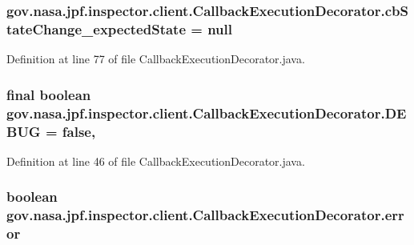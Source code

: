\subsubsection[{\texorpdfstring{cb\+State\+Change\+\_\+expected\+State}{cbStateChange_expectedState}}]{ gov.\+nasa.\+jpf.\+inspector.\+client.\+Callback\+Execution\+Decorator.\+cb\+State\+Change\+\_\+expected\+State = null\hspace{0.3cm}{\ttfamily [protected]}}\hypertarget{classgov_1_1nasa_1_1jpf_1_1inspector_1_1client_1_1_callback_execution_decorator_a300944aa979608f761bf4061da40f587}{}\label{classgov_1_1nasa_1_1jpf_1_1inspector_1_1client_1_1_callback_execution_decorator_a300944aa979608f761bf4061da40f587}


Definition at line 77 of file Callback\+Execution\+Decorator.\+java.

\subsubsection[{\texorpdfstring{D\+E\+B\+UG}{DEBUG}}]{\setlength{\rightskip}{0pt plus 5cm}final boolean gov.\+nasa.\+jpf.\+inspector.\+client.\+Callback\+Execution\+Decorator.\+D\+E\+B\+UG = false\hspace{0.3cm}{\ttfamily [static]}, {\ttfamily [protected]}}\hypertarget{classgov_1_1nasa_1_1jpf_1_1inspector_1_1client_1_1_callback_execution_decorator_a28cdde5503944b9bff2957ae0dc55d16}{}\label{classgov_1_1nasa_1_1jpf_1_1inspector_1_1client_1_1_callback_execution_decorator_a28cdde5503944b9bff2957ae0dc55d16}


Definition at line 46 of file Callback\+Execution\+Decorator.\+java.

\subsubsection[{\texorpdfstring{error}{error}}]{\setlength{\rightskip}{0pt plus 5cm}boolean gov.\+nasa.\+jpf.\+inspector.\+client.\+Callback\+Execution\+Decorator.\+error\hspace{0.3cm}{\ttfamily [protected]}}\hypertarget{classgov_1_1nasa_1_1jpf_1_1inspector_1_1client_1_1_callback_execution_decorator_a70e054c25db8a40468c6fea73ad2ea22}{}\label{classgov_1_1nasa_1_1jpf_1_1inspector_1_1client_1_1_callback_execution_decorator_a70e054c25db8a40468c6fea73ad2ea22}


